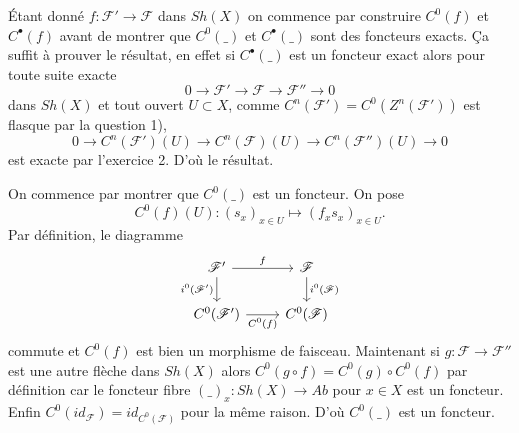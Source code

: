 \documentclass[a4paper,12pt]{article}
\newcommand{\F}{\mathscr F}
\theoremstyle{plain}
\theoremstyle{definition}
\theoremstyle{remark}
\begin{document}
Étant donné $f\colon \F'\to \F$ dans $Sh(X)$ on commence par construire 
$C^0(f)$ et $C^\bullet(f)$ avant de montrer que $C^0(\_)$ et 
$C^\bullet(\_)$ sont des foncteurs exacts. Ça suffit à prouver le 
résultat, en effet si $C^\bullet(\_)$ est un foncteur exact alors pour
toute suite exacte \[0\to \F'\to \F\to \F''\to 0\]
dans $Sh(X)$ et tout ouvert $U\subset X$,
comme $C^n(\F')=C^0(Z^n(\F'))$ est flasque par la question 1),
\[0\to C^n(\F')(U)\to C^n(\F)(U)\to C^n(\F'')(U)\to 0\] est exacte
par l'exercice 2. D'où le résultat.

On commence par montrer que $C^0(\_)$ est un foncteur. On pose
\[C^0(f)(U)\colon (s_x)_{x\in U}\mapsto (f_x s_x)_{x\in U}.\]
Par définition, le diagramme
\[\begin{tikzcd}
	{\F'} & \F \\
	{C^0(\F')} & {C^0(\F)}
	\arrow["f", from=1-1, to=1-2]
	\arrow["{i^0(\F')}"', from=1-1, to=2-1]
	\arrow["{i^0(\F)}", from=1-2, to=2-2]
	\arrow["{C^0(f)}"', from=2-1, to=2-2]
\end{tikzcd}\]
commute et $C^0(f)$ est bien un morphisme de faisceau. Maintenant 
si $g\colon \F\to \F''$ est une autre flèche dans $Sh(X)$ alors 
$C^0(g\circ f)=C^0(g)\circ C^0(f)$ par définition car le foncteur
fibre $(\_)_x \colon Sh(X)\to Ab$ pour $x\in X$ est un foncteur. Enfin
$C^0(id_\F)=id_{C^0(\F)}$ pour la même raison. D'où
$C^0(\_)$ est un foncteur.
\end{document}
